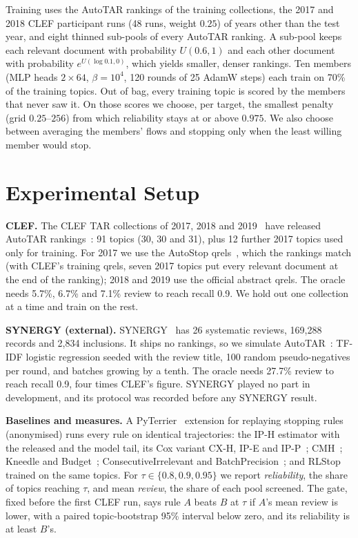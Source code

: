 \documentclass[sigconf,review,anonymous]{acmart}
\begin{document}
Training uses the AutoTAR rankings of the training collections, the 2017 and 2018 CLEF participant runs (48 runs, weight $0.25$) of years other than the test year, and eight thinned sub-pools of every AutoTAR ranking. A sub-pool keeps each relevant document with probability $U(0.6,1)$ and each other document with probability $e^{U(\log 0.1,0)}$, which yields smaller, denser rankings. Ten members (MLP heads $2\times64$, $\beta=10^4$, 120 rounds of 25 AdamW steps) each train on 70\% of the training topics. Out of bag, every training topic is scored by the members that never saw it. On those scores we choose, per target, the smallest penalty (grid $0.25$--$256$) from which reliability stays at or above $0.975$. We also choose between averaging the members' flows and stopping only when the least willing member would stop.

\section{Experimental Setup}

\textbf{CLEF.} The CLEF TAR collections of 2017, 2018 and 2019~\cite{kanoulas2017clef,kanoulas2018clef,kanoulas2019clef} have released AutoTAR rankings~\cite{stevenson2023point}: 91 topics (30, 30 and 31), plus 12 further 2017 topics used only for training. For 2017 we use the AutoStop qrels~\cite{li2020stop}, which the rankings match (with CLEF's training qrels, seven 2017 topics put every relevant document at the end of the ranking); 2018 and 2019 use the official abstract qrels. The oracle needs 5.7\%, 6.7\% and 7.1\% review to reach recall 0.9. We hold out one collection at a time and train on the rest.

\textbf{SYNERGY (external).} SYNERGY~\cite{debruin2023synergy} has 26 systematic reviews, 169{,}288 records and 2{,}834 inclusions. It ships no rankings, so we simulate AutoTAR~\cite{cormack2015autonomy}: TF-IDF logistic regression seeded with the review title, 100 random pseudo-negatives per round, and batches growing by a tenth. The oracle needs 27.7\% review to reach recall 0.9, four times CLEF's figure. SYNERGY played no part in development, and its protocol was recorded before any SYNERGY result.

\textbf{Baselines and measures.} A PyTerrier~\cite{macdonald2020pyterrier} extension for replaying stopping rules (anonymised) runs every rule on identical trajectories: the IP-H estimator with the released and the model tail, its Cox variant CX-H, IP-E and IP-P~\cite{stevenson2023point}; CMH~\cite{callaghan2020statistical}; Kneedle and Budget~\cite{cormack2016engineering}; ConsecutiveIrrelevant and BatchPrecision~\cite{yang2021heuristic}; and RLStop~\cite{binhezam2024rlstop} trained on the same topics. For $\tau\in\{0.8,0.9,0.95\}$ we report \emph{reliability}, the share of topics reaching $\tau$, and mean \emph{review}, the share of each pool screened. The gate, fixed before the first CLEF run, says rule $A$ beats $B$ at $\tau$ if $A$'s mean review is lower, with a paired topic-bootstrap 95\% interval below zero, and its reliability is at least $B$'s.
\end{document}
